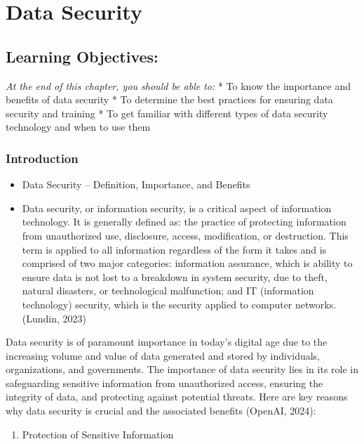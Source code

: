 \documentclass[
  letterpaper,
  DIV=11,
  numbers=noendperiod]{scrreprt}
\providecommand{\tightlist}{%
  \setlength{\itemsep}{0pt}\setlength{\parskip}{0pt}}\usepackage{longtable,booktabs,array}
\begin{document}

\chapter{Data Security}\label{data-security}

\section{Learning Objectives:}\label{learning-objectives-2}

\emph{At the end of this chapter, you should be able to:} * To know the
importance and benefits of data security * To determine the best
practices for ensuring data security and training * To get familiar with
different types of data security technology and when to use them

\subsection{Introduction}\label{introduction-1}

\begin{itemize}
\tightlist
\item
  Data Security -- Definition, Importance, and Benefits
\item
  Data security, or information security, is a critical aspect of
  information technology. It is generally defined as: the practice of
  protecting information from unauthorized use, disclosure, access,
  modification, or destruction. This term is applied to all information
  regardless of the form it takes and is comprised of two major
  categories: information assurance, which is ability to ensure data is
  not lost to a breakdown in system security, due to theft, natural
  disasters, or technological malfunction; and IT (information
  technology) security, which is the security applied to computer
  networks. (Lundin, 2023)
\end{itemize}

Data security is of paramount importance in today's digital age due to
the increasing volume and value of data generated and stored by
individuals, organizations, and governments. The importance of data
security lies in its role in safeguarding sensitive information from
unauthorized access, ensuring the integrity of data, and protecting
against potential threats. Here are key reasons why data security is
crucial and the associated benefits (OpenAI, 2024):

\begin{enumerate}
\def\labelenumi{\arabic{enumi}.}
\tightlist
\item
  Protection of Sensitive Information
\end{enumerate}
\end{document}
